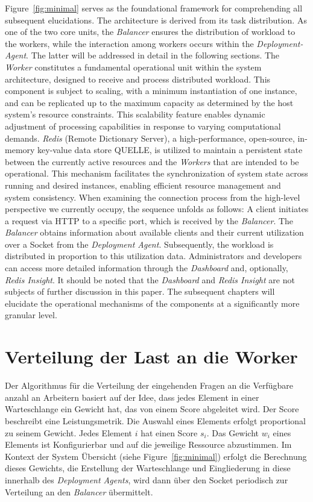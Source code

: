 \documentclass[twocolumn]{webofc}
\begin{document}
Figure~\ref{fig:minimal} serves as the foundational framework for comprehending all subsequent elucidations. The architecture is derived from its task distribution. As one of the two core units, the \textit{Balancer} ensures the distribution of workload to the workers, while the interaction among workers occurs within the \textit{Deployment-Agent}. The latter will be addressed in detail in the following sections. The \textit{Worker} constitutes a fundamental operational unit within the system architecture, designed to receive and process distributed workload. This component is subject to scaling, with a minimum instantiation of one instance, and can be replicated up to the maximum capacity as determined by the host system's resource constraints. This scalability feature enables dynamic adjustment of processing capabilities in response to varying computational demands.
\textit{Redis} (Remote Dictionary Server), a high-performance, open-source, in-memory key-value data store {\color{red} QUELLE}, is utilized to maintain a persistent state between the currently active resources and the \textit{Workers} that are intended to be operational. This mechanism facilitates the synchronization of system state across running and desired instances, enabling efficient resource management and system consistency. When examining the connection process from the high-level perspective we currently occupy, the sequence unfolds as follows: A client initiates a request via HTTP to a specific port, which is received by the \textit{Balancer}. The \textit{Balancer} obtains information about available clients and their current utilization over a Socket from the \textit{Deployment Agent}. Subsequently, the workload is distributed in proportion to this utilization data.
Administrators and developers can access more detailed information through the \textit{Dashboard} and, optionally, \textit{Redis Insight}. It should be noted that the \textit{Dashboard} and \textit{Redis Insight} are not subjects of further discussion in this paper.
The subsequent chapters will elucidate the operational mechanisms of the components at a significantly more granular level.

\section{Verteilung der Last an die Worker}
Der Algorithmus für die Verteilung der eingehenden Fragen an die Verfügbare anzahl an Arbeitern basiert auf der Idee, dass jedes Element in einer Warteschlange ein Gewicht hat, das von einem Score abgeleitet wird. Der Score beschreibt eine Leistungsmetrik. Die Auswahl eines Elements erfolgt proportional zu seinem Gewicht. Jedes Element \( i \) hat einen Score \( s_i \). Das Gewicht \( w_i \) eines Elements ist Konfigurierbar und auf die jeweilige Ressource abzustimmen. Im Kontext der System Übersicht (siehe Figure~\ref{fig:minimal}) erfolgt die Berechnung dieses Gewichts, die Erstellung der Warteschlange und Eingliederung in diese innerhalb des \textit{Deployment Agents}, wird dann über den Socket periodisch zur Verteilung an den \textit{Balancer} übermittelt.
\end{document}
